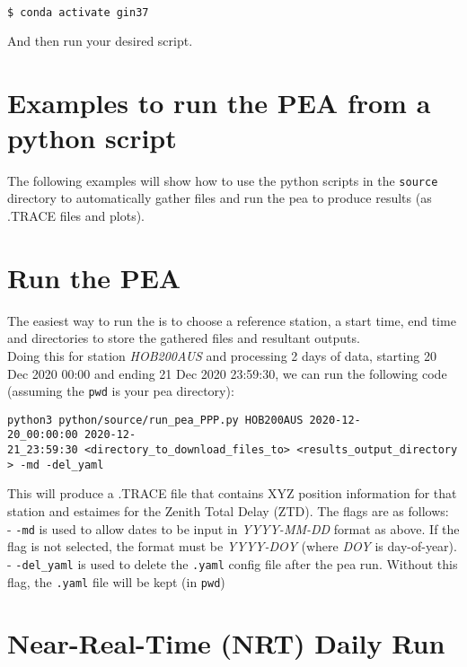 \begin{lstlisting}[language=bash,caption=Activating a conda environment]
$ conda activate gin37
\end{lstlisting}

And then run your desired script.

\section{Examples to run the PEA from a python script}\label{examples-to-run-the-pea-from-a-python-script}

The following examples will show how to use the python scripts in the
\texttt{source} directory to automatically gather files and run the pea
to produce results (as .TRACE files and plots).

\section{Run the PEA}\label{run-the-pea}

The easiest way to run the is to choose a reference station, a start
time, end time and directories to store the gathered files and resultant
outputs.\\
Doing this for station \emph{HOB200AUS} and processing 2 days of data,
starting 20 Dec 2020 00:00 and ending 21 Dec 2020 23:59:30, we can run
the following code (assuming the \texttt{pwd} is your pea directory):

\texttt{python3\ python/source/run\_pea\_PPP.py\ HOB200AUS\ 2020-12-20\_00:00:00\ 2020-12-21\_23:59:30\ \textless{}directory\_to\_download\_files\_to\textgreater{}\ \textless{}results\_output\_directory\textgreater{}\ -md\ -del\_yaml}

This will produce a .TRACE file that contains XYZ position information
for that station and estaimes for the Zenith Total Delay (ZTD). The
flags are as follows:\\
- \texttt{-md} is used to allow dates to be input in \emph{YYYY-MM-DD}
format as above. If the flag is not selected, the format must be
\emph{YYYY-DOY} (where \emph{DOY} is day-of-year).\\
- \texttt{-del\_yaml} is used to delete the \texttt{.yaml} config file
after the pea run. Without this flag, the \texttt{.yaml} file will be
kept (in \texttt{pwd})

\section{Near-Real-Time (NRT) Daily
Run}\label{near-real-time-nrt-daily-run}

